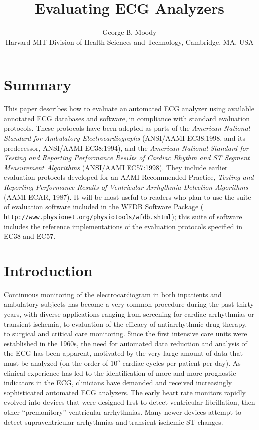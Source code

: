 \documentclass[twoside]{article}
\title{Evaluating ECG Analyzers}
\author{George B. Moody\\
Harvard-MIT Division of Health Sciences and Technology, Cambridge, MA, USA}
\date{}
\begin{document}
\setcounter{page}{129}

\maketitle

\section*{Summary}
This paper describes how to evaluate an automated ECG analyzer using
available annotated ECG databases and software, in compliance with
standard evaluation protocols.  These protocols have been adopted as
parts of the {\em American National Standard for Ambulatory
Electrocardiographs} (ANSI/AAMI EC38:1998, and its predecessor,
ANSI/AAMI EC38:1994), and the {\em American National Standard for
Testing and Reporting Performance Results of Cardiac Rhythm and ST
Segment Measurement Algorithms} (ANSI/AAMI EC57:1998).  They include
earlier evaluation protocols developed for an AAMI Recommended
Practice, {\em Testing and Reporting Performance Results of
Ventricular Arrhythmia Detection Algorithms} (AAMI ECAR, 1987).  It
will be most useful to readers who plan to use the suite of evaluation
software included in the WFDB Software Package ({\tt
http://www.\-physio\-net.\-org/\-physio\-tools/\-wfdb.\-shtml}); this
suite of software includes the reference implementations of the
evaluation protocols specified in EC38 and EC57.

\section{Introduction}
Continuous monitoring of the electrocardiogram in both inpatients and
ambulatory subjects has become a very common procedure during the past
thirty years, with diverse applications ranging from screening for cardiac
arrhythmias or transient ischemia, to evaluation of the efficacy of
antiarrhythmic drug therapy, to surgical and critical care monitoring.
Since the first intensive care units were established in the 1960s,
the need for automated data reduction and analysis of the ECG has been
apparent, motivated by the very large amount of data that must be
analyzed (on the order of $10^{5}$ cardiac cycles per patient per
day).  As clinical experience has led to the identification of more
and more prognostic indicators in the ECG, clinicians have demanded
and received increasingly sophisticated automated ECG analyzers.  The
early heart rate monitors rapidly evolved into devices that were
designed first to detect ventricular fibrillation, then other
``premonitory'' ventricular arrhythmias.  Many newer devices attempt
to detect supraventricular arrhythmias and transient ischemic ST
changes.
\end{document}
